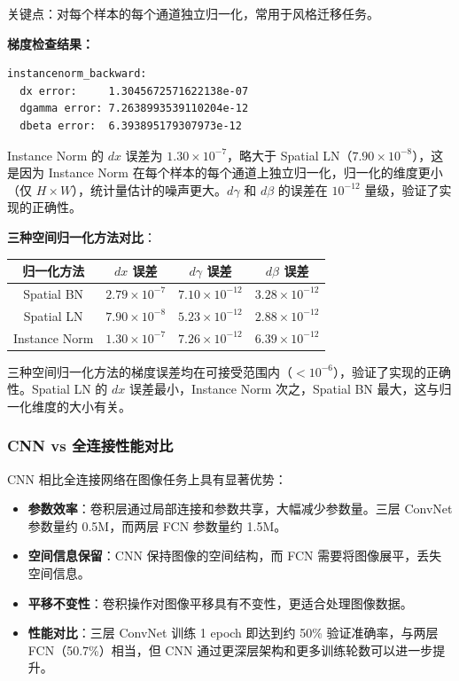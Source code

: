 \documentclass[a4paper]{article}
\begin{document}
关键点：对每个样本的每个通道独立归一化，常用于风格迁移任务。

\textbf{梯度检查结果：}

\begin{verbatim}
instancenorm_backward:
  dx error:     1.3045672571622138e-07
  dgamma error: 7.2638993539110204e-12
  dbeta error:  6.393895179307973e-12
\end{verbatim}

Instance Norm 的 $dx$ 误差为 $1.30 \times 10^{-7}$，略大于 Spatial LN（$7.90 \times 10^{-8}$），这是因为 Instance Norm 在每个样本的每个通道上独立归一化，归一化的维度更小（仅 $H \times W$），统计量估计的噪声更大。$d\gamma$ 和 $d\beta$ 的误差在 $10^{-12}$ 量级，验证了实现的正确性。

\textbf{三种空间归一化方法对比}：

\begin{center}
\begin{longtable}{c|c|c|c}
\toprule
\textbf{归一化方法} & \textbf{$dx$ 误差} & \textbf{$d\gamma$ 误差} & \textbf{$d\beta$ 误差} \\
\midrule
Spatial BN & $2.79 \times 10^{-7}$ & $7.10 \times 10^{-12}$ & $3.28 \times 10^{-12}$ \\
Spatial LN & $7.90 \times 10^{-8}$ & $5.23 \times 10^{-12}$ & $2.88 \times 10^{-12}$ \\
Instance Norm & $1.30 \times 10^{-7}$ & $7.26 \times 10^{-12}$ & $6.39 \times 10^{-12}$ \\
\bottomrule
\end{longtable}
\end{center}

三种空间归一化方法的梯度误差均在可接受范围内（$< 10^{-6}$），验证了实现的正确性。Spatial LN 的 $dx$ 误差最小，Instance Norm 次之，Spatial BN 最大，这与归一化维度的大小有关。

\subsubsection{CNN vs 全连接性能对比}

CNN 相比全连接网络在图像任务上具有显著优势：

\begin{itemize}
    \item \textbf{参数效率}：卷积层通过局部连接和参数共享，大幅减少参数量。三层 ConvNet 参数量约 0.5M，而两层 FCN 参数量约 1.5M。
    
    \item \textbf{空间信息保留}：CNN 保持图像的空间结构，而 FCN 需要将图像展平，丢失空间信息。
    
    \item \textbf{平移不变性}：卷积操作对图像平移具有不变性，更适合处理图像数据。
    
    \item \textbf{性能对比}：三层 ConvNet 训练 1 epoch 即达到约 50\% 验证准确率，与两层 FCN（50.7\%）相当，但 CNN 通过更深层架构和更多训练轮数可以进一步提升。
\end{itemize}
\end{document}
